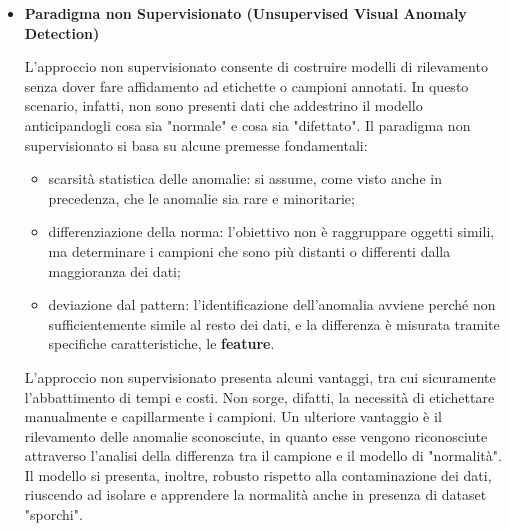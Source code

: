 \begin{itemize}
    \item \textbf{Paradigma non Supervisionato (Unsupervised Visual Anomaly Detection)}
    
    L'approccio non supervisionato consente di costruire modelli di rilevamento senza dover fare affidamento ad etichette o campioni annotati. In questo scenario, infatti, non sono presenti dati che addestrino il modello anticipandogli cosa sia "normale" e cosa sia "difettato". \cite{Cui_et_al._2023}
    Il paradigma non supervisionato si basa su alcune premesse fondamentali:
    \begin{itemize}
        \item scarsità statistica delle anomalie: si assume, come visto anche in precedenza, che le anomalie sia rare e minoritarie;
        \item differenziazione della norma: l'obiettivo non è raggruppare oggetti simili, ma determinare i campioni che sono più distanti o differenti dalla maggioranza dei dati;
        \item deviazione dal pattern: l'identificazione dell'anomalia avviene perché non sufficientemente simile al resto dei dati, e la differenza è misurata tramite specifiche caratteristiche, le \textbf{feature}.\cite{Guthrie_et_al._2007}
    \end{itemize}
    L'approccio non supervisionato presenta alcuni vantaggi, tra cui sicuramente l'abbattimento di tempi e costi. Non sorge, difatti, la necessità di etichettare manualmente e capillarmente i campioni. Un ulteriore vantaggio è il rilevamento delle anomalie sconosciute, in quanto esse vengono riconosciute attraverso l'analisi della differenza tra il campione e il modello di "normalità".\cite{Cui_et_al._2023} Il modello si presenta, inoltre, robusto rispetto alla contaminazione dei dati, riuscendo ad isolare e apprendere la normalità anche in presenza di dataset "sporchi".\cite{Lin_et_al._2021}
\end{itemize}


